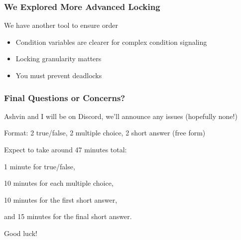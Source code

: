   \begin{frame}
    \frametitle{We Explored More Advanced Locking}

    We have another tool to ensure order

    \begin{itemize}
      \item Condition variables are clearer for complex condition signaling
      \item Locking granularity matters
      \item You must prevent deadlocks
    \end{itemize}
  \end{frame}

  \begin{frame}
    \frametitle{Final Questions or Concerns?}

    Ashvin and I will be on Discord, we'll announce any issues (hopefully none!)
    
    \vspace{2em}

    Format: 2 true/false, 2 multiple choice, 2 short answer (free form)

    \vspace{2em}

    Expect to take around 47 minutes total:
    
    \hspace{2em} 1 minute for true/false,
    
    \hspace{2em} 10 minutes for each multiple choice,

    \hspace{2em} 10 minutes for the first short answer,
    
    \hspace{2em} and 15 minutes for the final short answer.

    \vspace{2em}

    Good luck!
  \end{frame}

